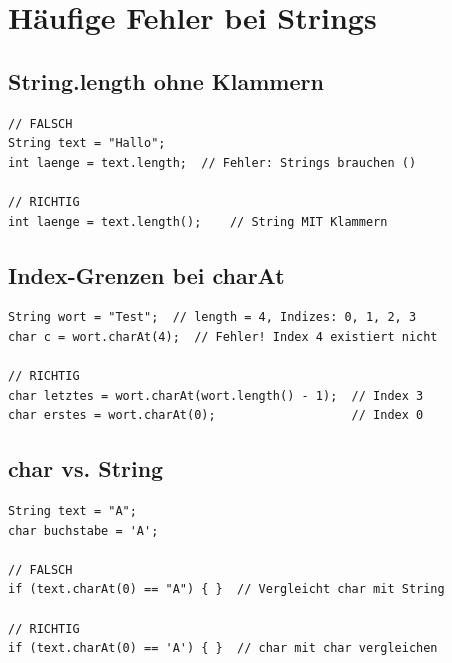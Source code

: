 \newpage


\section*{Häufige Fehler bei Strings}

\subsection*{String.length ohne Klammern}

\begin{lstlisting}
// FALSCH
String text = "Hallo";
int laenge = text.length;  // Fehler: Strings brauchen ()

// RICHTIG
int laenge = text.length();    // String MIT Klammern
\end{lstlisting}

\subsection*{Index-Grenzen bei charAt}

\begin{lstlisting}
String wort = "Test";  // length = 4, Indizes: 0, 1, 2, 3
char c = wort.charAt(4);  // Fehler! Index 4 existiert nicht

// RICHTIG
char letztes = wort.charAt(wort.length() - 1);  // Index 3
char erstes = wort.charAt(0);                   // Index 0
\end{lstlisting}

\subsection*{char vs. String}

\begin{lstlisting}
String text = "A";
char buchstabe = 'A';

// FALSCH
if (text.charAt(0) == "A") { }  // Vergleicht char mit String

// RICHTIG
if (text.charAt(0) == 'A') { }  // char mit char vergleichen
\end{lstlisting}
